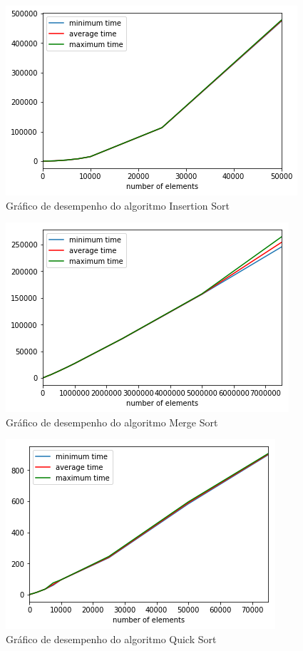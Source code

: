 \documentclass[a4paper,12pt]{scrartcl}
\begin{document}
\begin{figure}[H]
\centering
\includegraphics[scale=.75]{images/insertionsort.png}
\caption{Gráfico de desempenho do algoritmo Insertion Sort}
\label{mapaInsertion}
\end{figure}

\begin{figure}[H]
\centering
\includegraphics[scale=.75]{images/mergesort.png}
\caption{Gráfico de desempenho do algoritmo Merge Sort}
\label{mapaMerge}
\end{figure}

\begin{figure}[H]
\centering
\includegraphics[scale=.75]{images/quicksort.png}
\caption{Gráfico de desempenho do algoritmo Quick Sort}
\label{mapaQuick}
\end{figure}
\end{document}
